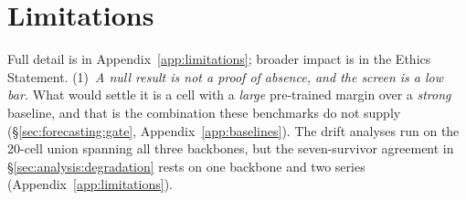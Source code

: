 \section{Limitations}
\label{sec:limitations}

Full detail is in Appendix~\ref{app:limitations}; broader impact is in the Ethics Statement.
(1)~\emph{A null result is not a proof of absence, and the screen is a low bar.}
What would settle it is a cell with a \emph{large}
pre-trained margin over a \emph{strong} baseline, and that is the combination these
benchmarks do not supply (\S\ref{sec:forecasting:gate},
Appendix~\ref{app:baselines}).
The drift analyses run on the 20-cell union
spanning all three backbones, but the seven-survivor agreement in
\S\ref{sec:analysis:degradation} rests on one backbone and two series
(Appendix~\ref{app:limitations}).
